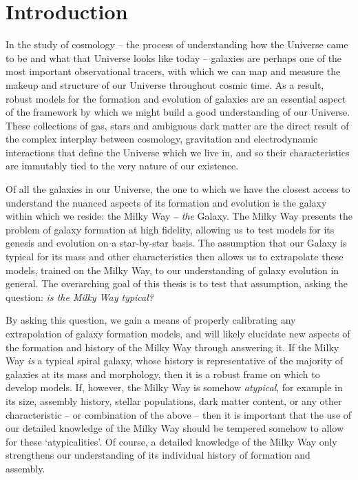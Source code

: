 \chapter{Introduction}
In the study of cosmology -- the process of understanding how the Universe came to be and what that Universe looks like today -- galaxies are perhaps one of the most important observational tracers, with which we can map and measure the makeup and structure of our Universe throughout cosmic time. As a result, robust models for the formation and evolution of galaxies are an essential aspect of the framework by which we might build a good understanding of our Universe. These collections of gas, stars and ambiguous dark matter are the direct result of the complex interplay between cosmology, gravitation and electrodynamic interactions that define the Universe which we live in, and so their characteristics are immutably tied to the very nature of our existence.

Of all the galaxies in our Universe, the one to which we have the closest access to understand the nuanced aspects of its formation and evolution is the galaxy within which we reside: the Milky Way -- \emph{the} Galaxy. The Milky Way presents the problem of galaxy formation at high fidelity, allowing us to test models for its genesis and evolution on a star-by-star basis. The assumption that our Galaxy is typical for its mass and other characteristics then allows us to extrapolate these models, trained on the Milky Way, to our understanding of galaxy evolution in general. The overarching goal of this thesis is to test that assumption, asking the question: \emph{is the Milky Way typical?}

By asking this question, we gain a means of properly calibrating any extrapolation of galaxy formation models, and will likely elucidate new aspects of the formation and history of the Milky Way through answering it. If the Milky Way \emph{is} a typical spiral galaxy, whose history is representative of the majority of galaxies at its mass and morphology, then it is a robust frame on which to develop models. If, however, the Milky Way is somehow \emph{atypical}, for example in its size, assembly history, stellar populations, dark matter content, or any other characteristic --  or combination of the above -- then it is important that the use of our detailed knowledge of the Milky Way should be tempered somehow to allow for these `atypicalities'. Of course, a detailed knowledge of the Milky Way only strengthens our understanding of its individual history of formation and assembly.

